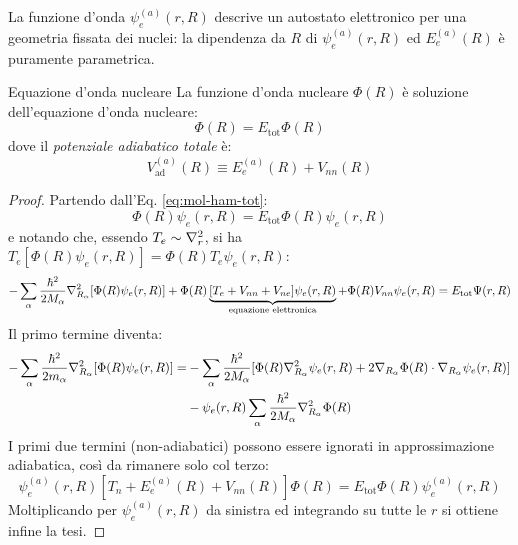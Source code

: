 La funzione d'onda $ \psi_e^{(a)}(r,R) $ descrive un autostato elettronico per una geometria fissata dei nuclei: la dipendenza da $ R $ di $ \psi_e^{(a)}(r,R) $ ed $ E_e^{(a)}(R) $ è puramente parametrica.

\begin{proposition}{Equazione d'onda nucleare}{}
	La funzione d'onda nucleare $ \Phi(R) $ è soluzione dell'equazione d'onda nucleare:
	\begin{equation}
		[T_n + V_\text{ad}^{(a)}(R)] \Phi(R) = E_\text{tot} \Phi(R)
		\label{eq:mol-nucl-eq}
	\end{equation}
	dove il \textit{potenziale adiabatico totale} è:
	\begin{equation}
		V_\text{ad}^{(a)}(R) \equiv E_e^{(a)}(R) + V_{nn}(R)
		\label{eq:ad-pot}
	\end{equation}

	\tcblower

	\begin{proof}
		Partendo dall'Eq. \ref{eq:mol-ham-tot}:
		\begin{equation*}
			[T_n + T_e + V_{nn} + V_{ne} + V_{ee}] \Phi(R) \psi_e(r,R) = E_\text{tot} \Phi(R) \psi_e(r,R)
		\end{equation*}
		e notando che, essendo $ T_e \sim \nabla^2_r $, si ha $ T_e [\Phi(R) \psi_e(r,R)] = \Phi(R) T_e \psi_e(r,R) $:
		\begin{equation*}
			- \sum_\alpha \frac{\hbar^2}{2M_\alpha} \nabla^2_{R_\alpha} [\Phi(R) \psi_e(r,R)] + \Phi(R) \underbrace{[T_e + V_{nn} + V_{ne}] \psi_e(r,R)}_{\text{equazione elettronica}} + \Phi(R) V_{nn} \psi_e(r,R) = E_\text{tot} \Psi(r,R)
		\end{equation*}
		Il primo termine diventa:
		\begin{equation*}
			\begin{split}
				- \sum_\alpha \frac{\hbar^2}{2m_\alpha} \nabla^2_{R_\alpha} [\Phi(R) \psi_e(r,R)]
				= & - \sum_\alpha \frac{\hbar^2}{2M_\alpha} [\Phi(R) \nabla^2_{R_\alpha} \psi_e(r,R) + 2 \nabla_{R_\alpha} \Phi(R) \cdot \nabla_{R_\alpha} \psi_e(r,R)] \\
				& - \psi_e(r,R) \sum_\alpha \frac{\hbar^2}{2M_\alpha} \nabla^2_{R_\alpha} \Phi(R)
			\end{split}
		\end{equation*}
		I primi due termini (non-adiabatici) possono essere ignorati in approssimazione adiabatica, così da rimanere solo col terzo:
		\begin{equation*}
			\psi_e^{(a)}(r,R) [T_n + E_e^{(a)}(R) + V_{nn}(R)] \Phi(R) = E_\text{tot} \Phi(R) \psi_e^{(a)}(r,R)
		\end{equation*}
		Moltiplicando per $ \psi_e^{(a)}(r,R) $ da sinistra ed integrando su tutte le $ r $ si ottiene infine la tesi.
	\end{proof}
\end{proposition}


